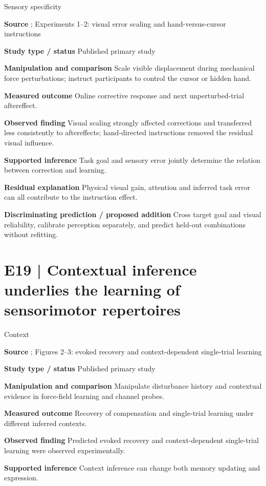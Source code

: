 \documentclass[11pt,a4paper]{article}
\begin{document}
{\small\sffamily\color{navy} Sensory specificity}\par
\textbf{Source} \cite{hoffmann2023}; Experiments 1--2: visual error scaling and hand-versus-cursor instructions\par
\textbf{Study type / status} Published primary study\par
\textbf{Manipulation and comparison} Scale visible displacement during mechanical force perturbations; instruct participants to control the cursor or hidden hand.\par
\textbf{Measured outcome} Online corrective response and next unperturbed-trial aftereffect.\par
\textbf{Observed finding} Visual scaling strongly affected corrections and transferred less consistently to aftereffects; hand-directed instructions removed the residual visual influence.\par
\textbf{Supported inference} Task goal and sensory error jointly determine the relation between correction and learning.\par
\textbf{Residual explanation} Physical visual gain, attention and inferred task error can all contribute to the instruction effect.\par
\textbf{Discriminating prediction / proposed addition} Cross target goal and visual reliability, calibrate perception separately, and predict held-out combinations without refitting.\par
\clearpage\section{E19 | Contextual inference underlies the learning of sensorimotor repertoires}
{\small\sffamily\color{navy} Context}\par
\textbf{Source} \cite{coin2021}; Figures 2--3: evoked recovery and context-dependent single-trial learning\par
\textbf{Study type / status} Published primary study\par
\textbf{Manipulation and comparison} Manipulate disturbance history and contextual evidence in force-field learning and channel probes.\par
\textbf{Measured outcome} Recovery of compensation and single-trial learning under different inferred contexts.\par
\textbf{Observed finding} Predicted evoked recovery and context-dependent single-trial learning were observed experimentally.\par
\textbf{Supported inference} Context inference can change both memory updating and expression.\par
\end{document}

